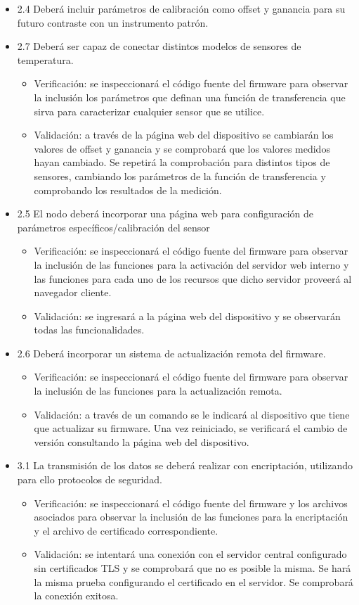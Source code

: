 \documentclass[11pt]{charter}
\begin{document}
\begin{itemize}
\item 2.4 Deberá incluir parámetros de calibración como offset y ganancia para su futuro contraste con un instrumento patrón.
\item 2.7 Deberá ser capaz de conectar distintos modelos de sensores de temperatura.
\begin{itemize}
\item Verificación: se inspeccionará el código fuente del firmware para observar la inclusión los parámetros que definan una función de transferencia que sirva para caracterizar cualquier sensor que se utilice.
\item Validación: a través de la página web del dispositivo se cambiarán los valores de offset y ganancia y se comprobará que los valores medidos hayan cambiado. Se repetirá la comprobación para distintos tipos de sensores, cambiando los parámetros de la función de transferencia y comprobando los resultados de la medición.
\end{itemize}

\item 2.5 El nodo deberá incorporar una página web para configuración de parámetros específicos/calibración del sensor
\begin{itemize}
\item Verificación: se inspeccionará el código fuente del firmware para observar la inclusión de las funciones para la activación del servidor web interno y las funciones para cada uno de los recursos que dicho servidor proveerá al navegador cliente.
\item Validación: se ingresará a la página web del dispositivo y se observarán todas las funcionalidades.
\end{itemize}


\item 2.6 Deberá incorporar un sistema de actualización remota del firmware.
\begin{itemize}
\item Verificación: se inspeccionará el código fuente del firmware para observar la inclusión de las funciones para la actualización remota.
\item Validación: a través de un comando se le indicará al dispositivo que tiene que actualizar su firmware. Una vez reiniciado, se verificará el cambio de versión consultando la página web del dispositivo.
\end{itemize}

\item 3.1 La transmisión de los datos se deberá realizar con encriptación, utilizando para ello protocolos de seguridad.
\begin{itemize}
\item Verificación: se inspeccionará el código fuente del firmware y los archivos asociados para observar la inclusión de las funciones para la encriptación y el archivo de certificado correspondiente.
\item Validación: se intentará una conexión con el servidor central configurado sin certificados TLS y se comprobará que no es posible la misma. Se hará la misma prueba configurando el certificado en el servidor. Se comprobará la conexión exitosa.
\end{itemize}


\end{itemize}
\end{document}
